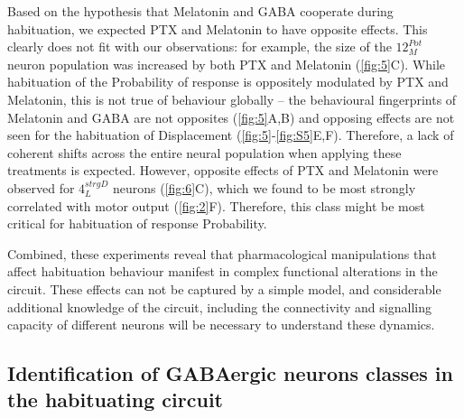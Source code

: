 \documentclass[9pt,lineno]{RandlettLab_elife}
\begin{document}
Based on the hypothesis that Melatonin and GABA cooperate during habituation, we expected PTX and Melatonin to have opposite effects. This clearly does not fit with our observations: for example, the size of the $12_{M}^{Pot}$ neuron population was increased by both PTX and Melatonin (\autoref{fig:5}C). While habituation of the Probability of response is oppositely modulated by PTX and Melatonin, this is not true of behaviour globally -- the behavioural fingerprints of Melatonin and GABA are not opposites (\autoref{fig:5}A,B) and opposing effects are not seen for the habituation of Displacement (\autoref{fig:5}-\autoref{fig:S5}E,F). Therefore, a lack of coherent shifts across the entire neural population when applying these treatments is expected. However, opposite effects of PTX and Melatonin were observed for $4_{L}^{strgD}$ neurons (\autoref{fig:6}C), which we found to be most strongly correlated with motor output (\autoref{fig:2}F). Therefore, this class might be most critical for habituation of response Probability. 

Combined, these experiments reveal that pharmacological manipulations that affect habituation behaviour manifest in complex functional alterations in the circuit. These effects can not be captured by a simple model, and considerable additional knowledge of the circuit, including the connectivity and signalling capacity of different neurons will be necessary to understand these dynamics. 

\subsection{Identification of GABAergic neurons classes in the habituating circuit}
\vspace{2mm}
\end{document}
